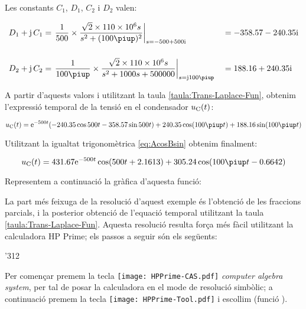 \begin{exemple}
    Les constants $C_1$, $D_1$,  $C_2$ i $D_2$ valen:

    \begin{alignat*}{2}
        D_1 + \ju\,C_1 &= \left.\frac{1}{500}\times \frac{\sqrt{2}\times 110\times 10^6 s}
        {s^2 +(100\piup)^2}\right|_{s=\complexnum{-500+j500}} &&= \complexnum{-358,57 -j 240,35}\\[3ex]
        D_2 + \ju\,C_2 &= \left.\frac{1}{100\piup}\times\frac{\sqrt{2}\times 110\times 10^6 s}
        {s^2 + 1000 s + 500000}\right|_{s=\ju 100\piup} &&= \complexnum{188,16 + j240,35}
    \end{alignat*}

    A partir d'aquests valors i utilitzant la taula
    \vref{taula:Trans-Laplace-Fun}, obtenim l'expressió temporal de la
    tensió en el condensador $u_\mathrm{C}(t)$:

    \[
        u\ped{C}(t) = \eu^{-500t} (\num{-240,35} \cos 500 t - \num{358,57} \sin 500
        t) + \num{240,35} \cos (100\piup t) + \num{188,16} \sin( 100\piup
        t)
    \]

    Utilitzant la igualtat trigonomètrica \eqref{eq:AcosBsin} obtenim finalment:

    \[
        u\ped{C}(t)= \num{431,67} \eu^{-500t} \cos(500 t +\num{2,1613}) + \num{305,24} \cos (100\piup t - \num{0,6642})
    \]

    Representem a continuació la gràfica d'aquesta
    funció:

    \begin{center}
      
    \end{center}

    La part més feixuga de la resolució d'aquest exemple és l'obtenció de les fraccions parcials, i la posterior obtenció de l'equació temporal utilitzant la taula \ref{taula:Trans-Laplace-Fun}. Aquesta resolució resulta força més fàcil utilitzant la calculadora \textsf{HP Prime};
    els passos a seguir són els següents:

    \begin{dingautolist}{'312}

        \item Per començar premem la tecla \texttt{[image: HPPrime-CAS.pdf]} \textit{computer algebra system}, per tal de posar la calculadora en el mode de resolució simbòlic; a continuació premem la tecla \texttt{[image: HPPrime-Tool.pdf]} i escollim  (funció ).


\end{dingautolist}
\end{exemple}
